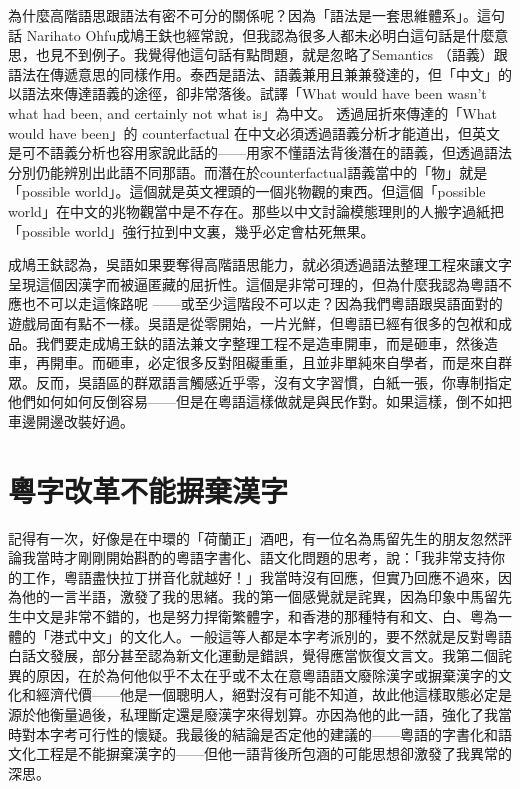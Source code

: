 \documentclass[a5paper, 12pt, openany]{book} %
\begin{document}
為什麼高階語思跟語法有密不可分的關係呢？因為「語法是一套思維體系」。這句話
Narihato Ohfu成鳩王鈇也經常說，但我認為很多人都未必明白這句話是什麼意思，也見不到例子。我覺得他這句話有點問題，就是忽略了Semantics （語義）跟語法在傳遞意思的同樣作用。泰西是語法、語義兼用且兼兼發達的，但「中文」的以語法來傳達語義的途徑，卻非常落後。試譯「What would have been wasn’t what had been, and certainly not what is」為中文。 透過屈折來傳達的「What would have been」的 counterfactual 在中文必須透過語義分析才能道出，但英文是可不語義分析也容用家說此話的——用家不懂語法背後潛在的語義，但透過語法分別仍能辨別出此語不同那語。而潛在於counterfactual語義當中的「物」就是「possible world」。這個就是英文裡頭的一個兆物觀的東西。但這個「possible world」在中文的兆物觀當中是不存在。那些以中文討論模態理則的人搬字過紙把「possible world」強行拉到中文裏，幾乎必定會枯死無果。

成鳩王鈇認為，吳語如果要奪得高階語思能力，就必須透過語法整理工程來讓文字呈現這個因漢字而被逼匿藏的屈折性。這個是非常可理的，但為什麼我認為粵語不應也不可以走這條路呢 ——或至少這階段不可以走？因為我們粵語跟吳語面對的遊戲局面有點不一樣。吳語是從零開始，一片光鮮，但粵語已經有很多的包袱和成品。我們要走成鳩王鈇的語法兼文字整理工程不是造車開車，而是砸車，然後造車，再開車。而砸車，必定很多反對阻礙重重，且並非單純來自學者，而是來自群眾。反而，吳語區的群眾語言觸感近乎零，沒有文字習慣，白紙一張，你專制指定他們如何如何反倒容易——但是在粵語這樣做就是與民作對。如果這樣，倒不如把車邊開邊改裝好過。

\section{粵字改革不能摒棄漢字}

記得有一次，好像是在中環的「荷蘭正」酒吧，有一位名為馬留先生的朋友忽然評論我當時才剛剛開始斟酌的粵語字書化、語文化問題的思考，說：「我非常支持你的工作，粵語盡快拉丁拼音化就越好！」我當時沒有回應，但實乃回應不過來，因為他的一言半語，激發了我的思緒。我的第一個感覺就是詫異，因為印象中馬留先生中文是非常不錯的，也是努力捍衛繁體字，和香港的那種特有和文、白、粵為一體的「港式中文」的文化人。一般這等人都是本字考派別的，要不然就是反對粵語白話文發展，部分甚至認為新文化運動是錯誤，覺得應當恢復文言文。我第二個詫異的原因，在於為何他似乎不太在乎或不太在意粵語語文廢除漢字或摒棄漢字的文化和經濟代價——他是一個聰明人，絕對沒有可能不知道，故此他這樣取態必定是源於他衡量過後，私理斷定還是廢漢字來得划算。亦因為他的此一語，強化了我當時對本字考可行性的懷疑。我最後的結論是否定他的建議的——粵語的字書化和語文化工程是不能摒棄漢字的——但他一語背後所包涵的可能思想卻激發了我異常的深思。
\end{document}
